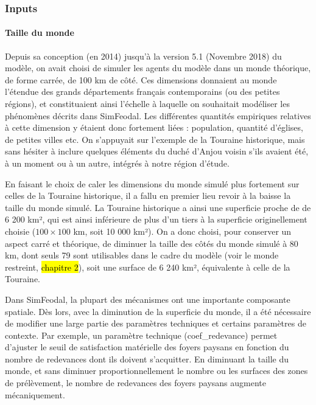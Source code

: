 \subsubsection*{Inputs}
\paragraph{Taille du monde}

Depuis sa conception (en 2014) jusqu'à la version 5.1 (Novembre 2018) du modèle, on avait choisi de simuler les agents du modèle dans un monde théorique, de forme carrée, de 100 km de côté.
Ces dimensions donnaient au monde l'étendue des grands départements français contemporains (ou des petites régions), et constituaient ainsi l'échelle à laquelle on souhaitait modéliser les phénomènes décrits dans SimFeodal.
Les différentes quantités empiriques relatives à cette dimension y étaient donc fortement liées : population, quantité d'églises, de petites villes etc.
On s'appuyait sur l'exemple de la Touraine historique, mais sans hésiter à inclure quelques éléments du duché d'Anjou voisin s'ils avaient été, à un moment ou à un autre, intégrés à notre région d'étude.

En faisant le choix de caler les dimensions du monde simulé plus fortement sur celles de la Touraine historique, il a fallu en premier lieu revoir à la baisse la taille du monde simulé.
La Touraine historique a ainsi une superficie proche de de 6 200 km², qui est ainsi inférieure de plus d'un tiers à la superficie originellement choisie ($100 \times 100$ km, soit 10 000 km²).
On a donc choisi, pour conserver un aspect carré et théorique, de diminuer la taille des côtés du monde simulé à 80 km, dont seuls 79 sont utilisables dans le cadre du modèle (voir le monde restreint, \hl{chapitre 2}), soit une surface de 6 240 km², équivalente à celle de la Touraine.

Dans SimFeodal, la plupart des mécanismes ont une importante composante spatiale.
Dès lors, avec la diminution de la superficie du monde, il a été nécessaire de modifier une large partie des paramètres techniques et certains paramètres de contexte.
Par exemple, un paramètre technique (\textsf{coef\_redevance}) permet d'ajuster le seuil de satisfaction matérielle des foyers paysans en fonction du nombre de redevances dont ils doivent s'acquitter.
En diminuant la taille du monde, et sans diminuer proportionnellement le nombre ou les surfaces des zones de prélèvement, le nombre de redevances des foyers paysans augmente mécaniquement.

